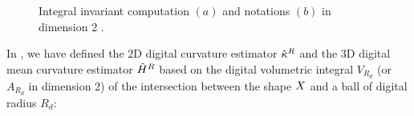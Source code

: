 \documentclass{llncs}
\begin{document}
\begin{figure}[t]{\small
    \begin{center}
      \vspace{-0.4cm}
    \end{center}}
    \caption{Integral invariant computation $(a)$ and
      notations $(b)$ in dimension 2 \cite{CVIU2014}.\label{fig:notations}}
\end{figure}


In \cite{DGCI2013}, we have defined the 2D digital curvature estimator
$\hat{\kappa}^{R}$ and the 3D digital mean curvature estimator $\hat{H}^{R}$ based on
the digital volumetric integral $V_{R_d}$ (or $A_{R_d}$ in dimension 2) of the
intersection between the shape $X$ and a ball of digital radius $R_d$:
\end{document}
